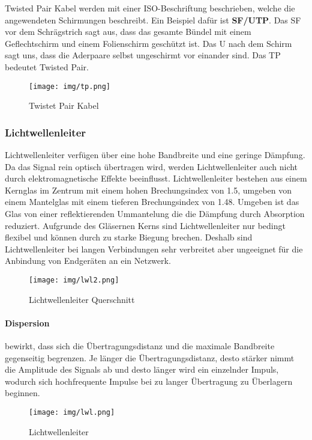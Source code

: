 \documentclass{article}
\begin{document}
Twisted Pair Kabel werden mit einer ISO-Beschriftung beschrieben, welche die angewendeten Schirmungen beschreibt. Ein Beispiel dafür ist \textbf{SF/UTP}. Das SF vor dem Schrägstrich sagt aus, dass das gesamte Bündel mit einem Geflechtschirm und einem Folienschirm geschützt ist. Das U nach dem Schirm sagt uns, dass die Aderpaare selbst ungeschirmt vor einander sind. Das TP bedeutet Twisted Pair. 
\begin{figure}[h!]
		\begin{center}
		\texttt{[image: img/tp.png]}
		\end{center}
		\caption{Twistet Pair Kabel}
		\label{fig:Twistet Pair Kabel}
\end{figure}
\subsubsection{Lichtwellenleiter}
Lichtwellenleiter verfügen über eine hohe Bandbreite und eine geringe Dämpfung. Da das Signal rein optisch übertragen wird, werden Lichtwellenleiter auch nicht durch elektromagnetische Effekte beeinflusst. Lichtwellenleiter bestehen aus einem Kernglas im Zentrum mit einem hohen Brechungsindex von 1.5, umgeben von einem Mantelglas mit einem tieferen Brechungsindex von 1.48. Umgeben ist das Glas von einer reflektierenden Ummantelung die die Dämpfung durch Absorption reduziert. Aufgrunde des Gläsernen Kerns sind Lichtwellenleiter nur bedingt flexibel und können durch zu starke Biegung brechen. Deshalb sind Lichtwellenleiter bei langen Verbindungen sehr verbreitet aber ungeeignet für die Anbindung von Endgeräten an ein Netzwerk.
\begin{figure}[h!]
		\begin{center}
		\texttt{[image: img/lwl2.png]}
		\end{center}
		\caption{Lichtwellenleiter Querschnitt}
		\label{fig:Lichtwellenleiter Querschnitt}
\end{figure}
\paragraph{Dispersion}
bewirkt, dass sich die Übertragungsdistanz und die maximale Bandbreite gegenseitig begrenzen. Je länger die Übertragungsdistanz, desto stärker nimmt die Amplitude des Signals ab und desto länger wird ein einzelnder Impuls, wodurch sich hochfrequente Impulse bei zu langer Übertragung zu Überlagern beginnen.
\begin{figure}[h!]
		\begin{center}
		\texttt{[image: img/lwl.png]}
		\end{center}
		\caption{Lichtwellenleiter}
		\label{fig:Lichtwellenleiter}
\end{figure}
\end{document}
